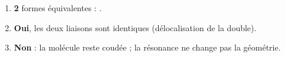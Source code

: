 \documentclass[11pt,a4paper]{article}
\begin{document}
\begin{corrige}
\begin{enumerate}[label=\alph*)]
  \item \textbf{2} formes équivalentes : .
  \item \textbf{Oui}, les deux liaisons  sont identiques (délocalisation de la double).
  \item \textbf{Non} : la molécule reste coudée ; la résonance ne change pas la géométrie.
\end{enumerate}
\end{corrige}
\end{document}
